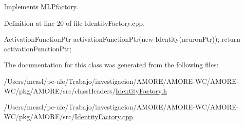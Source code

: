 Implements \hyperlink{class_m_l_pfactory_a92109ea285be7dd847d359a1ade9064a}{MLPfactory}.



Definition at line 20 of file IdentityFactory.cpp.


\begin{DoxyCode}
  {
    ActivationFunctionPtr activationFunctionPtr(new Identity(neuronPtr));
    return activationFunctionPtr;
  }
\end{DoxyCode}


The documentation for this class was generated from the following files:\begin{DoxyCompactItemize}
\item 
/Users/mcasl/pc-\/ule/Trabajo/investigacion/AMORE/AMORE-\/WC/AMORE-\/WC/pkg/AMORE/src/classHeaders/\hyperlink{_identity_factory_8h}{IdentityFactory.h}\item 
/Users/mcasl/pc-\/ule/Trabajo/investigacion/AMORE/AMORE-\/WC/AMORE-\/WC/pkg/AMORE/src/\hyperlink{_identity_factory_8cpp}{IdentityFactory.cpp}\end{DoxyCompactItemize}
